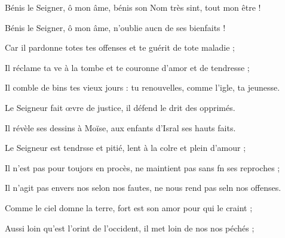 \item Bénis le Seigner, ô mon âme,\psstar{} bénis son Nom très sint, tout mon être !
\item Bénis le Seigner, ô mon âme,\psstar{} n’oublie aucn de ses bienfaits !
\item Car il pardonne totes tes offenses\psstar{} et te guérit de tote maladie ;
\item Il réclame ta ve à la tombe\psstar{} et te couronne d’amor et de tendresse ;
\item Il comble de bins tes vieux jours :\psstar{} tu renouvelles, comme l’igle, ta jeunesse.
\item Le Seigneur fait œvre de justice,\psstar{} il défend le drit des opprimés.
\item Il révèle ses dessins à Moïse,\psstar{} aux enfants d’Isral ses hauts faits.
\item Le Seigneur est tendrsse et pitié,\psstar{} lent à la colre et plein d’amour ;
\item Il n’est pas pour toujors en procès,\psstar{} ne maintient pas sans fn ses reproches ;
\item Il n’agit pas envers nos selon nos fautes,\psstar{} ne nous rend pas seln nos offenses.
\item Comme le ciel domne la terre,\psstar{} fort est son amor pour qui le craint ;
\item Aussi loin qu’est l’orint de l’occident,\psstar{} il met loin de nos nos péchés ;